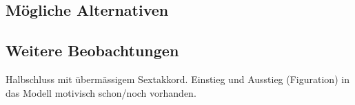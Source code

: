 \subsection{Mögliche Alternativen}



\subsection{Weitere Beobachtungen}

Halbschluss mit übermässigem Sextakkord.
Einstieg und Ausstieg (Figuration) in das Modell motivisch schon/noch vorhanden.
